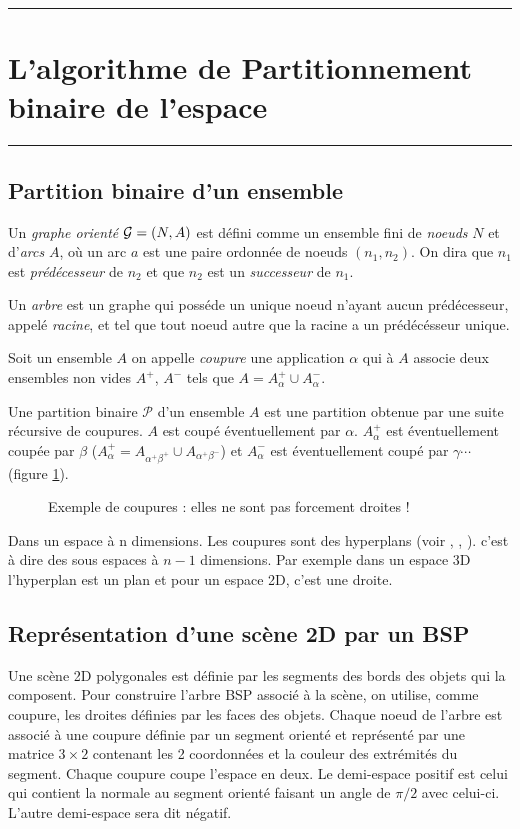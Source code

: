 \documentclass[a4paper,11pt]{amsart}
\newcommand{\dessin}[4]{
\begin{figure}[htb]
\centering
\HideDisplacementBoxes 
\BoxedEPSF{#1 scaled #2}
\caption{#3}
\label{#4}
\end{figure}}
\newcommand{\PP}{{\mathcal P}} \newcommand{\QQ}{{\mathcal Q}}
\begin{document}
\vfill \newpage
\vspace{0.5cm}\hrule
\section{L'algorithme de Partitionnement binaire de l'espace}
\hrule\vspace{0.5cm}

\subsection{Partition binaire d'un ensemble}
Un \emph{graphe orient\'e} ${\mathcal G}=(N,A)$ est d\'efini comme un ensemble 
fini de \emph{noeuds} $N$ et d'\emph{arcs} $A$, o\`u un arc $a$ est 
une paire ordonn\'ee de noeuds $(n_1,n_2)$.  On dira que $n_1$ est 
\emph{pr\'ed\'ecesseur} de $n_2$ et que $n_2$ est un \emph{successeur} 
de $n_1$.

Un \emph{arbre} est un graphe qui poss\'ede un unique noeud n'ayant 
aucun pr\'ed\'ecesseur, appel\'e \emph{racine}, et tel que tout noeud 
autre que la racine a un pr\'ed\'ec\'esseur unique.

Soit un ensemble $A$ on appelle \emph{coupure} une 
application $\alpha$ qui \`a $A$ associe deux ensembles non vides 
$A^+$, $A^-$ tels que $A=A_\alpha^{+} \cup A_\alpha^{-}$.

Une partition binaire $\PP$ d'un ensemble $A$ est une partition 
obtenue par une suite r\'ecursive de coupures.  $A$ est coup\'e 
\'eventuellement par $\alpha$.  $A_\alpha^{+}$ est \'eventuellement 
coup\'ee par $\beta$ ($A_\alpha^+=A_{\alpha^+\beta^+}\cup 
A_{\alpha^+\beta^-}$) et $A_\alpha^{-}$ est \'eventuellement coup\'e 
par $\gamma \cdots$ (figure \ref{coupure}).

\dessin{coupure.epsf}{800}{Exemple de coupures : elles ne sont pas 
forcement droites !}{coupure}
%

Dans un espace \`a n dimensions.  Les coupures sont des hyperplans 
(voir \cite{FAQ}, \cite{GEO}, \cite{WEB}). c'est \`a dire des sous espaces \`a $n-1$ dimensions.  Par exemple 
dans un espace 3D l'hyperplan est un plan et pour un espace 2D, c'est 
une droite.

\subsection{Repr\'esentation d'une sc\`ene 2D par un BSP}
Une sc\`ene 2D polygonales est d\'efinie par les segments des bords 
des objets qui la composent.  Pour construire l'arbre BSP associ\'e 
\`a la sc\`ene, on utilise, comme coupure, les droites d\'efinies par 
les faces des objets.  Chaque noeud de l'arbre est associ\'e \`a une 
coupure d\'efinie par un segment orient\'e et repr\'esent\'e par une 
matrice $3\times 2$ contenant les 2 coordonn\'ees et la couleur des 
extr\'emit\'es du segment.  Chaque coupure coupe l'espace en deux.  Le 
demi-espace positif est celui qui contient la normale au segment 
orient\'e faisant un angle de $\pi/2$ avec celui-ci.  L'autre 
demi-espace sera dit n\'egatif. 
\end{document}
